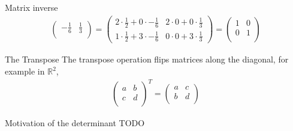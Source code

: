 \documentclass[notes]{beamer}
\begin{document}
\begin{frame}{Matrix inverse}
{\begin{align}
\begin{pmatrix}
          -\frac{1}{6} & \frac{1}{3}\\ 
        \end{pmatrix}
      = 
        \begin{pmatrix}
          2 \cdot \frac{1}{2} + 0 \cdot -\frac{1}{6} & 2 \cdot 0 + 0 \cdot \frac{1}{3}  \\
          1 \cdot \frac{1}{2} + 3 \cdot -\frac{1}{6} & 0 \cdot 0 + 3 \cdot \frac{1}{3} 
        \end{pmatrix}
      =
      \begin{pmatrix}
        1 & 0 \\
        0 & 1 \\ 
      \end{pmatrix}
      \end{align}
      }
    \end{frame}


    \begin{frame}{The Transpose}
      The transpose operation flips matrices along the diagonal, for example in $\mathbb{R}^2$,
      \begin{align}
        \begin{pmatrix}
          a & b \\
          c & d \\
        \end{pmatrix}^T
        =
        \begin{pmatrix}
          a & c \\
          b & d \\
        \end{pmatrix}
      \end{align}
    \end{frame}

    \begin{frame}{Motivation of the determinant}
      TODO
    \end{frame}
\end{document}
